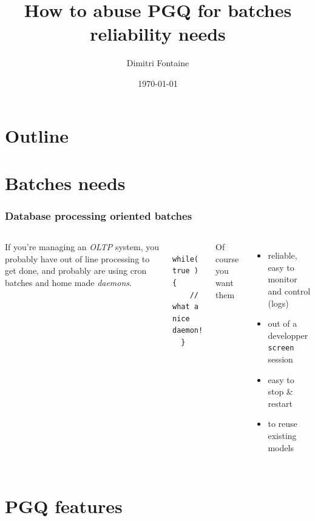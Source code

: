 \documentclass{beamer}
\title{How to abuse PGQ for batches reliability needs}
\author{Dimitri Fontaine}
\date{\today}
\begin{document}
\frame{\titlepage}

\section*{Outline}

\section{Batches needs}

\begin{frame}[fragile]
  \frametitle{Database processing oriented batches}

\begin{columns}[c]


If you're managing an \textit{OLTP} system, you probably have out of line
processing to get done, and probably are using cron batches and home made
\textit{daemons}.

\pause
\begin{example}
\begin{verbatim}
  while( true ) {
    // what a nice daemon!
  }
\end{verbatim}
\end{example}

\pause
{} 
  Of course you want them 
  \begin{itemize}
   \item<3-> reliable, easy to monitor and control (logs)
   \item<4-> out of a developper \texttt{screen} session
   \item<5-> easy to stop \& restart
   \item<6-> to reuse existing models
  \end{itemize}

\end{columns}
\end{frame}

\section{PGQ features}

\end{document}
